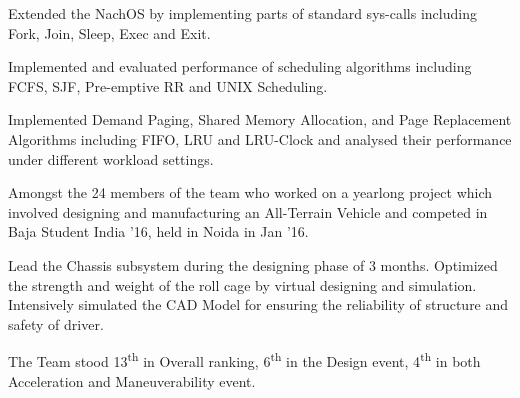 \documentclass[a4paper]{norm-resume}
\begin{document}
\vspace{5mm}

 
\begin{tightitemize}
        \small
        {
        \item Extended the NachOS by implementing parts of standard sys-calls including Fork, Join, Sleep, Exec and Exit.
        \item Implemented and evaluated performance of scheduling algorithms including FCFS, SJF, Pre-emptive RR and UNIX Scheduling.
        \item Implemented Demand Paging, Shared Memory Allocation, and Page Replacement Algorithms including FIFO, LRU and LRU-Clock and analysed their performance under different workload settings.
        }
\end{tightitemize}

\vspace{5mm}

 
\begin{tightitemize}
        \small
        {
        \item Amongst the 24 members of the team who worked on a yearlong project which involved designing and manufacturing an All-Terrain Vehicle and competed in Baja Student India ’16, held in Noida in Jan ’16.
        \item Lead the Chassis subsystem during the designing phase of 3 months. Optimized the strength and weight of the roll cage by virtual designing and simulation. Intensively simulated the CAD Model for ensuring the reliability of structure and safety of driver.
        \item The Team stood 13\textsuperscript{th} in Overall ranking, 6\textsuperscript{th} in the Design event, 4\textsuperscript{th} in both Acceleration and Maneuverability event.
        }
\end{tightitemize}

\vspace{5mm}

\end{document}
